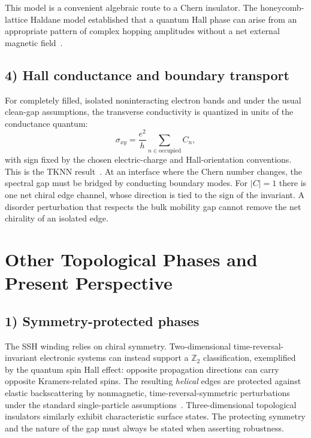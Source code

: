 \begin{center}
\end{center}
This model is a convenient algebraic route to a Chern insulator. The honeycomb-lattice Haldane model established that a quantum Hall phase can arise from an appropriate pattern of complex hopping amplitudes without a net external magnetic field~\cite{Haldane1988}.

\subsection*{4) Hall conductance and boundary transport}
For completely filled, isolated noninteracting electron bands and under the usual clean-gap assumptions, the transverse conductivity is quantized in units of the conductance quantum:
\begin{equation}
\boxed{\sigma_{xy}=\frac{e^2}{h}\sum_{n\in\mathrm{occupied}}C_n,}
\end{equation}
with sign fixed by the chosen electric-charge and Hall-orientation conventions. This is the TKNN result~\cite{TKNN1982}. At an interface where the Chern number changes, the spectral gap must be bridged by conducting boundary modes. For $|C|=1$ there is one net chiral edge channel, whose direction is tied to the sign of the invariant. A disorder perturbation that respects the bulk mobility gap cannot remove the net chirality of an isolated edge.



\section{Other Topological Phases and Present Perspective}
\subsection*{1) Symmetry-protected phases}
The SSH winding relies on chiral symmetry. Two-dimensional time-reversal-invariant electronic systems can instead support a $\mathbb Z_2$ classification, exemplified by the quantum spin Hall effect: opposite propagation directions can carry opposite Kramers-related spins. The resulting \emph{helical} edges are protected against elastic backscattering by nonmagnetic, time-reversal-symmetric perturbations under the standard single-particle assumptions~\cite{QiZhang2011}. Three-dimensional topological insulators similarly exhibit characteristic surface states. The protecting symmetry and the nature of the gap must always be stated when asserting robustness.

